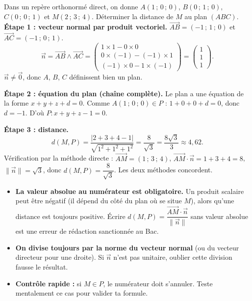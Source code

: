 \documentclass[11pt]{article}
\begin{document}
\begin{exoresolu}
Dans un repère orthonormé direct, on donne $A(1\,;\,0\,;\,0)$, $B(0\,;\,1\,;\,0)$, $C(0\,;\,0\,;\,1)$ et $M(2\,;\,3\,;\,4)$. Déterminer la distance de $M$ au plan $(ABC)$.
\tcblower
\textbf{Étape 1 : vecteur normal par produit vectoriel.}
$\overrightarrow{AB} = (-1\,;\,1\,;\,0)$ et $\overrightarrow{AC} = (-1\,;\,0\,;\,1)$.
\[ \vec{n} = \overrightarrow{AB} \wedge \overrightarrow{AC} = \begin{pmatrix} 1 \times 1 - 0 \times 0 \\ 0 \times (-1) - (-1) \times 1 \\ (-1) \times 0 - 1 \times (-1) \end{pmatrix} = \begin{pmatrix} 1 \\ 1 \\ 1 \end{pmatrix}. \]
$\vec{n} \neq \vec{0}$, donc $A$, $B$, $C$ définissent bien un plan.

\textbf{Étape 2 : équation du plan (chaîne complète).} Le plan a une équation de la forme $x + y + z + d = 0$. Comme $A(1\,;\,0\,;\,0) \in P$ : $1 + 0 + 0 + d = 0$, donc $d = -1$. D'où $P : x + y + z - 1 = 0$.

\textbf{Étape 3 : distance.}
\[ d(M, P) = \frac{|2 + 3 + 4 - 1|}{\sqrt{1^2+1^2+1^2}} = \frac{8}{\sqrt{3}} = \frac{8\sqrt{3}}{3} \approx 4{,}62. \]
Vérification par la méthode directe : $\overrightarrow{AM} = (1\,;\,3\,;\,4)$, $\overrightarrow{AM} \cdot \vec{n} = 1+3+4 = 8$, $\|\vec{n}\| = \sqrt{3}$, donc $d(M,P) = \dfrac{8}{\sqrt{3}}$. Les deux méthodes concordent.
\end{exoresolu}

\begin{attention}
\begin{itemize}
\item \textbf{La valeur absolue au numérateur est obligatoire.} Un produit scalaire peut être négatif (il dépend du côté du plan où se situe $M$), alors qu'une distance est toujours positive. Écrire $d(M,P) = \dfrac{\overrightarrow{AM} \cdot \vec{n}}{\|\vec{n}\|}$ sans valeur absolue est une erreur de rédaction sanctionnée au Bac.
\item \textbf{On divise toujours par la norme du vecteur normal} (ou du vecteur directeur pour une droite). Si $\vec{n}$ n'est pas unitaire, oublier cette division fausse le résultat.
\item \textbf{Contrôle rapide :} si $M \in P$, le numérateur doit s'annuler. Teste mentalement ce cas pour valider ta formule.
\end{itemize}
\end{attention}
\end{document}
